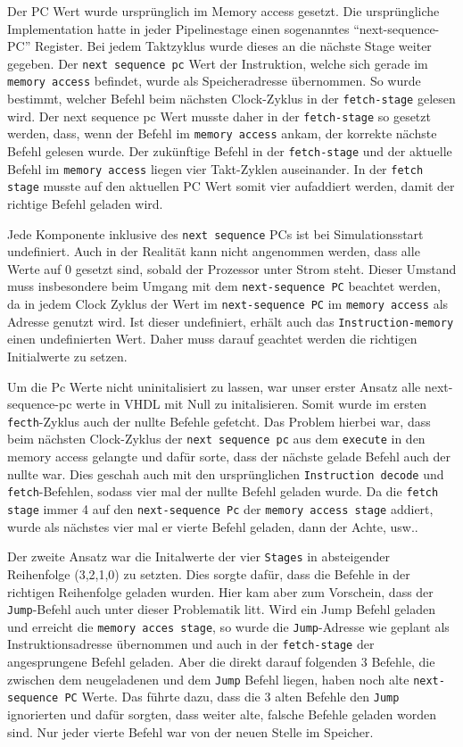 \documentclass[paper=a4,fontsize=11pt,twocolumn]{scrreprt}
\begin{document}
Der PC Wert wurde ursprünglich im Memory access gesetzt.
Die ursprüngliche Implementation hatte in jeder Pipelinestage einen sogenanntes \enquote{next-sequence-PC} Register.
Bei jedem Taktzyklus wurde dieses an die nächste Stage weiter gegeben.
Der \texttt{next sequence pc} Wert der Instruktion, welche sich gerade im \texttt{memory access} befindet, wurde als Speicheradresse übernommen.
So wurde bestimmt, welcher Befehl beim nächsten Clock-Zyklus in der \texttt{fetch-stage} gelesen wird. 
Der next sequence pc Wert musste daher in der \texttt{fetch-stage} so gesetzt werden, dass, wenn der Befehl im \texttt{memory access} ankam, der korrekte nächste Befehl gelesen wurde. 
Der zukünftige Befehl in der \texttt{fetch-stage} und der aktuelle Befehl im \texttt{memory access} liegen vier Takt-Zyklen auseinander.
In der \texttt{fetch stage} musste auf den aktuellen PC Wert somit vier aufaddiert werden, damit der richtige Befehl geladen wird.

Jede Komponente inklusive des \texttt{next sequence} PCs ist bei Simulationsstart undefiniert.
Auch in der Realität kann nicht angenommen werden, dass alle Werte auf 0 gesetzt sind, sobald der Prozessor unter Strom steht.
Dieser Umstand muss insbesondere beim Umgang mit dem \texttt{next-sequence PC} beachtet werden, da in jedem Clock Zyklus der Wert im \texttt{next-sequence PC} im \texttt{memory access} als Adresse genutzt wird.
Ist dieser undefiniert, erhält auch das \texttt{Instruction-memory} einen undefinierten Wert.
Daher muss darauf geachtet werden  die richtigen Initialwerte zu setzen.

Um die Pc Werte nicht uninitalisiert zu lassen, war unser erster Ansatz alle next-sequence-pc werte in VHDL mit Null zu initalisieren.
Somit wurde im ersten \texttt{fecth}-Zyklus auch der nullte Befehle gefetcht.
Das Problem hierbei war, dass beim nächsten Clock-Zyklus der \texttt{next sequence pc} aus dem \texttt{execute} in den memory access gelangte und dafür sorte, dass der nächste gelade Befehl auch der nullte war. 
Dies geschah auch mit den ursprünglichen \texttt{Instruction decode} und \texttt{fetch}-Befehlen, sodass vier mal der nullte Befehl geladen wurde.
Da die \texttt{fetch stage} immer 4 auf den \texttt{next-sequence Pc} der \texttt{memory access stage} addiert, wurde als nächstes vier mal er vierte Befehl geladen, dann der Achte, usw..

Der zweite Ansatz war die Initalwerte der vier \texttt{Stages} in absteigender Reihenfolge (3,2,1,0) zu setzten.
Dies sorgte dafür, dass die Befehle in der richtigen Reihenfolge geladen wurden.
Hier kam aber zum Vorschein, dass der \texttt{Jump}-Befehl auch unter dieser Problematik litt.
Wird ein Jump Befehl geladen und erreicht die \texttt{memory acces stage}, so wurde die \texttt{Jump}-Adresse wie geplant als Instruktionsadresse übernommen und auch in der \texttt{fetch-stage} der angesprungene Befehl geladen.
Aber die direkt darauf folgenden 3 Befehle, die zwischen dem neugeladenen und dem \texttt{Jump} Befehl liegen, haben noch alte \texttt{next-sequence PC} Werte.
Das führte dazu, dass die 3 alten Befehle den \texttt{Jump} ignorierten und dafür sorgten, dass weiter alte, falsche Befehle geladen worden sind.
Nur jeder vierte Befehl war von der neuen Stelle im Speicher.
\end{document}
